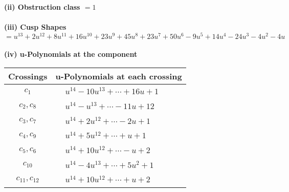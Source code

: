 \documentclass[1p]{elsarticle_modified}
\theoremstyle{definition}
\begin{document}
\flushleft \textbf{(ii) Obstruction class $= 1$}\\~\\
\flushleft \textbf{(iii) Cusp Shapes $= u^{13}+2 u^{12}+8 u^{11}+16 u^{10}+23 u^9+45 u^8+23 u^7+50 u^6-9 u^5+14 u^4-24 u^3-4 u^2-4 u$}\\~\\
\newpage\renewcommand{\arraystretch}{1}
\flushleft \textbf{(iv) u-Polynomials at the component}\newline \\
\begin{tabular}{m{50pt}|m{274pt}}
Crossings & \hspace{64pt}u-Polynomials at each crossing \\
\hline $$\begin{aligned}c_{1}\end{aligned}$$&$\begin{aligned}
&u^{14}-10 u^{13}+\cdots+16 u+1
\end{aligned}$\\
\hline $$\begin{aligned}c_{2},c_{8}\end{aligned}$$&$\begin{aligned}
&u^{14}- u^{13}+\cdots-11 u+12
\end{aligned}$\\
\hline $$\begin{aligned}c_{3},c_{7}\end{aligned}$$&$\begin{aligned}
&u^{14}+2 u^{12}+\cdots-2 u+1
\end{aligned}$\\
\hline $$\begin{aligned}c_{4},c_{9}\end{aligned}$$&$\begin{aligned}
&u^{14}+5 u^{12}+\cdots+u+1
\end{aligned}$\\
\hline $$\begin{aligned}c_{5},c_{6}\end{aligned}$$&$\begin{aligned}
&u^{14}+10 u^{12}+\cdots- u+2
\end{aligned}$\\
\hline $$\begin{aligned}c_{10}\end{aligned}$$&$\begin{aligned}
&u^{14}-4 u^{13}+\cdots+5 u^2+1
\end{aligned}$\\
\hline $$\begin{aligned}c_{11},c_{12}\end{aligned}$$&$\begin{aligned}
&u^{14}+10 u^{12}+\cdots+u+2
\end{aligned}$\\
\hline
\end{tabular}\\~\\
\end{document}
